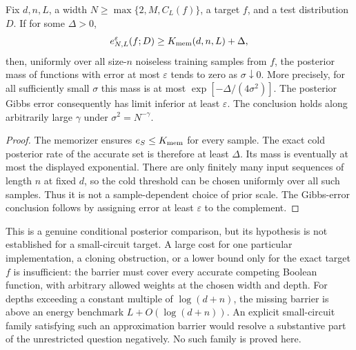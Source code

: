 \begin{corollary}
\label{cor:cold-approximation-barrier}
Fix $d,n,L$, a width $N\ge\max\{2,M,C_L(f)\}$, a target $f$, and a
test distribution $D$. If for some $\Delta>0$,
\[
 e_{N,L}^{\varepsilon}(f;D)
     \ge K_{\rm mem}(d,n,L)+\Delta,
\]
then, uniformly over all size-$n$ noiseless training samples from $f$,
the posterior mass of functions with error at most $\varepsilon$ tends
to zero as $\sigma\downarrow0$. More precisely, for all sufficiently
small $\sigma$ this mass is at most $\exp[-\Delta/(4\sigma^2)]$.
The posterior Gibbs error consequently has limit inferior at least
$\varepsilon$. The conclusion holds along arbitrarily large
$\gamma$ under $\sigma^2=N^{-\gamma}$.
\end{corollary}

\begin{proof}
The memorizer ensures $e_S\le K_{\rm mem}$ for every sample. The exact
cold posterior rate of the accurate set is therefore at least $\Delta$.
Its mass is eventually at most the displayed exponential. There are only
finitely many input sequences of length $n$ at fixed $d$, so the cold
threshold can be chosen uniformly over all such samples. Thus it is not
a sample-dependent choice of prior scale. The Gibbs-error conclusion
follows by assigning error at least $\varepsilon$ to the complement.
\end{proof}

This is a genuine conditional posterior comparison, but its hypothesis
is not established for a small-circuit target. A large cost for one
particular implementation, a cloning obstruction, or a lower bound only
for the exact target $f$ is insufficient: the barrier must cover every
accurate competing Boolean function, with arbitrary allowed weights at
the chosen width and depth. For depths exceeding a constant multiple of
$\log(d+n)$, the missing barrier is above an energy benchmark
$L+O(\log(d+n))$. An explicit small-circuit family satisfying such an
approximation barrier would resolve a substantive part of the unrestricted
question negatively. No such family is proved here.
